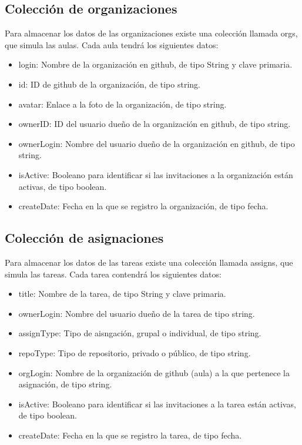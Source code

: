 \subsection{Colección de organizaciones}
\label{3:4:2}

Para almacenar los datos de las organizaciones existe una colección llamada orgs, que simula las aulas. Cada aula tendrá los siguientes datos:

\begin{itemize}
  \item login: Nombre de la organización en github, de tipo String y clave primaria.
  \item id: ID de github de la organización, de tipo string.
  \item avatar: Enlace a la foto de la organización, de tipo string.
  \item ownerID: ID del usuario dueño de la organización en github, de tipo string.
  \item ownerLogin: Nombre del usuario dueño de la organización en github, de tipo string.
  \item isActive: Booleano para identificar si las invitaciones a la organización están activas, de tipo boolean.
  \item createDate: Fecha en la que se registro la organización, de tipo fecha.
\end{itemize}

\subsection{Colección de asignaciones}
\label{3:4:3}

Para almacenar los datos de las tareas existe una colección llamada assigns, que simula las tareas. Cada tarea contendrá los siguientes datos:

\begin{itemize}
  \item title: Nombre de la tarea, de tipo String y clave primaria.
  \item ownerLogin: Nombre del usuario dueño de la tarea de tipo string.
  \item assignType: Tipo de aisngación, grupal o individual, de tipo string.
  \item repoType: Tipo de repositorio, privado o público, de tipo string.
  \item orgLogin: Nombre de la organización de github (aula) a la que pertenece la asignación, de tipo string.
  \item isActive: Booleano para identificar si las invitaciones a la tarea están activas, de tipo boolean.
  \item createDate: Fecha en la que se registro la tarea, de tipo fecha.
\end{itemize}

